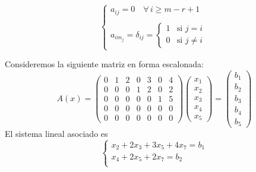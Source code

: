 \documentclass[12pt,a4paper]{book}
\begin{document}
    \begin{equation*}
    \left\{
        \begin{array}{l}
            a_{ij} = 0 \quad \forall\, i \geq m - r + 1 \\
            \\
            a_{i m_j} = \delta_{ij} =
            \begin{cases}
                1 & \text{si } j = i \\
                0 & \text{si } j \ne i
            \end{cases}
        \end{array}
    \right.
    \end{equation*}
    \begin{ejemplo}
        Consideremos la siguiente matriz en forma escalonada:
        \begin{equation*}
            A(x)=
            \begin{pmatrix}
                0 & 1 & 2 & 0 & 3 & 0 & 4\\
                0 & 0 & 0 & 1 & 2 & 0 & 2\\
                0 & 0 & 0 & 0 & 0 & 1 & 5\\
                0 & 0 & 0 & 0 & 0 & 0 & 0\\
                0 & 0 & 0 & 0 & 0 & 0 & 0
            \end{pmatrix}
            \begin{pmatrix}
                x_{1}\\
                x_{2}\\
                x_{3}\\
                x_{4}\\
                x_{5}
            \end{pmatrix}
            =
            \begin{pmatrix}
                b_{1}\\
                b_{2}\\
                b_{3}\\
                b_{4}\\
                b_{5}
            \end{pmatrix}
        \end{equation*}
        El sistema lineal asociado es
        \begin{equation*}
            \begin{cases}
                x_{2}+2x_{3}+3x_{5}+4x_{7}=b_{1}\\
                x_{4}+2x_{5}+2x_{7}=b_{2}\\

\end{cases}
\end{equation*}
\end{ejemplo}
\end{document}
